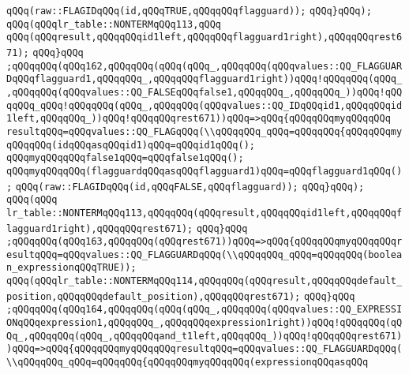 \verb|qQQq(raw::FLAGIDqQQq(id,qQQqTRUE,qQQqqQQqflagguard));|\newline
\verb|qQQq}qQQq);|\newline
\verb|qQQq(qQQqlr_table::NONTERMqQQq113,qQQq|\newline
\verb|qQQq(qQQqresult,qQQqqQQqid1left,qQQqqQQqflagguard1right),qQQqqQQqrest671);|\newline
\verb|qQQq}qQQq|\newline
\verb|;qQQqqQQq(qQQq162,qQQqqQQq(qQQq(qQQq_,qQQqqQQq(qQQqvalues::QQ_FLAGGUARDqQQqflagguard1,qQQqqQQq_,qQQqqQQqflagguard1right))qQQq!qQQqqQQq(qQQq_,qQQqqQQq(qQQqvalues::QQ_FALSEqQQqfalse1,qQQqqQQq_,qQQqqQQq_))qQQq!qQQqqQQq_qQQq!qQQqqQQq(qQQq_,qQQqqQQq(qQQqvalues::QQ_IDqQQqid1,qQQqqQQqid1left,qQQqqQQq_))qQQq!qQQqqQQqrest671))qQQq=>qQQq{qQQqqQQqmyqQQqqQQq|\newline
\verb|resultqQQq=qQQqvalues::QQ_FLAGqQQq(\\qQQqqQQq_qQQq=qQQqqQQq{qQQqqQQqmyqQQqqQQq(idqQQqasqQQqid1)qQQq=qQQqid1qQQq();|\newline
\verb|qQQqmyqQQqqQQqfalse1qQQq=qQQqfalse1qQQq();|\newline
\verb|qQQqmyqQQqqQQq(flagguardqQQqasqQQqflagguard1)qQQq=qQQqflagguard1qQQq();|\newline
\verb|qQQq(raw::FLAGIDqQQq(id,qQQqFALSE,qQQqflagguard));|\newline
\verb|qQQq}qQQq);|\newline
\verb|qQQq(qQQq|\newline
\verb|lr_table::NONTERMqQQq113,qQQqqQQq(qQQqresult,qQQqqQQqid1left,qQQqqQQqflagguard1right),qQQqqQQqrest671);|\newline
\verb|qQQq}qQQq|\newline
\verb|;qQQqqQQq(qQQq163,qQQqqQQq(qQQqrest671))qQQq=>qQQq{qQQqqQQqmyqQQqqQQqresultqQQq=qQQqvalues::QQ_FLAGGUARDqQQq(\\qQQqqQQq_qQQq=qQQqqQQq(boolean_expressionqQQqTRUE));|\newline
\verb|qQQq(qQQqlr_table::NONTERMqQQq114,qQQqqQQq(qQQqresult,qQQqqQQqdefault_position,qQQqqQQqdefault_position),qQQqqQQqrest671);|\newline
\verb|qQQq}qQQq|\newline
\verb|;qQQqqQQq(qQQq164,qQQqqQQq(qQQq(qQQq_,qQQqqQQq(qQQqvalues::QQ_EXPRESSIONqQQqexpression1,qQQqqQQq_,qQQqqQQqexpression1right))qQQq!qQQqqQQq(qQQq_,qQQqqQQq(qQQq_,qQQqqQQqand_t1left,qQQqqQQq_))qQQq!qQQqqQQqrest671))qQQq=>qQQq{qQQqqQQqmyqQQqqQQqresultqQQq=qQQqvalues::QQ_FLAGGUARDqQQq(\\qQQqqQQq_qQQq=qQQqqQQq{qQQqqQQqmyqQQqqQQq(expressionqQQqasqQQq|\newline
